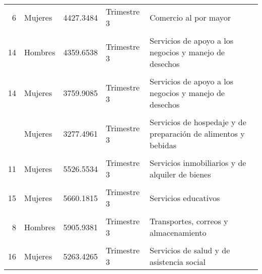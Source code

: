 \documentclass{article}
\begin{document}
\begin{table}[!h]
\begin{tabular}{rlrll}
6 & Mujeres & 4427.3484 & Trimestre 3 & Comercio al por mayor\\
\addlinespace
\cellcolor{gray!10}{5} & \cellcolor{gray!10}{Hombres} & \cellcolor{gray!10}{5060.6349} & \cellcolor{gray!10}{Trimestre 3} & \cellcolor{gray!10}{Industrias manufactureras}\\
14 & Hombres & 4359.6538 & Trimestre 3 & Servicios de apoyo a los negocios y manejo de desechos\\
\cellcolor{gray!10}{7} & \cellcolor{gray!10}{Hombres} & \cellcolor{gray!10}{3991.5391} & \cellcolor{gray!10}{Trimestre 3} & \cellcolor{gray!10}{Comercio al por menor}\\
14 & Mujeres & 3759.9085 & Trimestre 3 & Servicios de apoyo a los negocios y manejo de desechos\\
\cellcolor{gray!10}{6} & \cellcolor{gray!10}{Hombres} & \cellcolor{gray!10}{5453.5443} & \cellcolor{gray!10}{Trimestre 3} & \cellcolor{gray!10}{Comercio al por mayor}\\
\addlinespace
18 & Mujeres & 3277.4961 & Trimestre 3 & Servicios de hospedaje y de preparación de alimentos y bebidas\\
\cellcolor{gray!10}{4} & \cellcolor{gray!10}{Hombres} & \cellcolor{gray!10}{5805.7873} & \cellcolor{gray!10}{Trimestre 3} & \cellcolor{gray!10}{Construcción}\\
11 & Mujeres & 5526.5534 & Trimestre 3 & Servicios inmobiliarios y de alquiler de bienes\\
\cellcolor{gray!10}{19} & \cellcolor{gray!10}{Mujeres} & \cellcolor{gray!10}{3098.8665} & \cellcolor{gray!10}{Trimestre 3} & \cellcolor{gray!10}{Otros servicios, excepto actividades gubernamentales}\\
15 & Mujeres & 5660.1815 & Trimestre 3 & Servicios educativos\\
\addlinespace
\cellcolor{gray!10}{20} & \cellcolor{gray!10}{Mujeres} & \cellcolor{gray!10}{6162.3187} & \cellcolor{gray!10}{Trimestre 3} & \cellcolor{gray!10}{Actividades gubernamentales y de organismos internacionales}\\
8 & Hombres & 5905.9381 & Trimestre 3 & Transportes, correos y almacenamiento\\
\cellcolor{gray!10}{17} & \cellcolor{gray!10}{Hombres} & \cellcolor{gray!10}{4799.2461} & \cellcolor{gray!10}{Trimestre 3} & \cellcolor{gray!10}{Servicios de esparcimiento, culturales y deportivos}\\
16 & Mujeres & 5263.4265 & Trimestre 3 & Servicios de salud y de asistencia social\\

\end{tabular}
\end{table}
\end{document}
